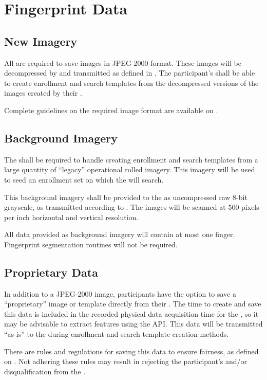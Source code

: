 \section{Fingerprint Data}

\subsection{New Imagery}
All \scanners are required to save images in JPEG-2000 format. These images
will be decompressed by \beframework and transmitted as defined in
. The participant's \lib shall be able to create
enrollment and search templates from the decompressed versions of the images
created by their \scanner.

Complete guidelines on the required image format are available on
\theprojectwebsite.

\subsection{Background Imagery}
The \lib shall be required to handle creating enrollment and search templates
from a large quantity of ``legacy'' operational rolled imagery. This imagery
will be used to seed an enrollment set on which the \lib will search.

This background imagery shall be provided to the \lib as uncompressed raw 8-bit
grayscale, as transmitted according to . The images
will be scanned at $500$ pixels per inch horizontal and vertical resolution.

All data provided as background imagery will contain at most one finger.
Fingerprint segmentation routines will not be required.

\subsection{Proprietary Data}
In addition to a JPEG-2000 image, participants have the option to save a
``proprietary'' image or template directly from their \scanner. The time to
create and save this data is included in the recorded physical data acquisition
time for the \scanner, so it may be advisable to extract features using the
API.  This data will be transmitted ``as-is'' to the \lib during enrollment and
search template creation methods.

There are rules and regulations for saving this data to ensure fairness, as
defined on \theprojectwebsite. Not adhering these rules may result in
rejecting the participant's \lib and/or disqualification from the \project. 

